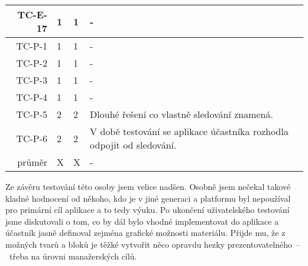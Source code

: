 \begin{longtable}{r|p{2cm}|p{2cm}|p{6cm}}
TC-E-17  & 1 & 1 & - \\\hline
TC-P-1   & 1 & 1 & - \\\hline
TC-P-2   & 1 & 1 & - \\\hline
TC-P-3   & 1 & 1 & - \\\hline
TC-P-4   & 1 & 1 & - \\\hline
TC-P-5   & 2 & 2 & Dlouhé řešení co vlastně sledování znamená. \\\hline
TC-P-6   & 2 & 2 & V době testování se aplikace účastníka rozhodla odpojit od sledování. \\\hline\hline
průměr   & X & X & - \\
\end{longtable}

Ze závěru testování této osoby jsem velice nadšen.
Osobně jsem nečekal takové kladné hodnocení od někoho, kdo je v jiné generaci a platformu byl nepoužíval pro primární cíl aplikace a to tedy výuku.
Po ukončení uživatelského testování jsme diskutovali o tom, co by dál bylo vhodné implementovat do aplikace a účastník jasně definoval zejména grafické možnosti materiálu.
Přijde mu, že z možných tvarů a bloků je těžké vytvořit něco opravdu hezky prezentovatelného~--~třeba na úrovni manažerských cílů.


